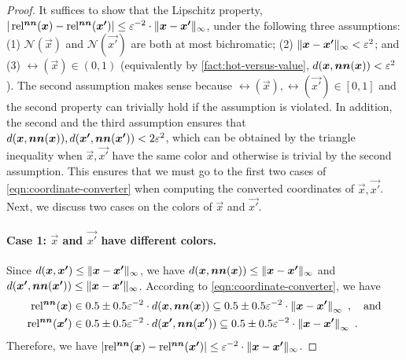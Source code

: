 \begin{proof}
    It suffices to show that the Lipschitz property, $|\operatorname*{rel^{\boldsymbol{nn}}}(\boldsymbol{x})-\operatorname*{rel^{\boldsymbol{nn}}}(\boldsymbol{x'})|\leq \varepsilon^{-2} \cdot \| {\boldsymbol{x}-\boldsymbol{x'}} \|_{\infty}$, under the following three assumptions: (1) $\mathcal{N}(\vec{x})$ and $\mathcal{N}(\vec{x'})$ are both at most bichromatic; (2) $\| {\boldsymbol{x}-\boldsymbol{x'}} \|_{\infty} < \varepsilon^2$; and (3) $\rel(\vec{x})\in (0,1)$ (equivalently by \cref{fact:hot-versus-value}, $d(\boldsymbol{x}, \operatorname*{\boldsymbol{nn}}(\boldsymbol{x}))<\varepsilon^2$). 
    The second assumption makes sense because $\rel(\vec{x}), \rel(\vec{x'})\in [0,1]$ and the second property can trivially hold if the assumption is violated.
    In addition, the second and the third assumption ensures that $d(\boldsymbol{x}, \operatorname*{\boldsymbol{nn}}(\boldsymbol{x})), d(\boldsymbol{x'}, \operatorname*{\boldsymbol{nn}}(\boldsymbol{x'})) < 2\varepsilon^2$, which
    can be obtained by the triangle inequality when $\vec{x}, \vec{x'}$ have the same color and otherwise is trivial by the second assumption.
    This ensures that we must go to the first two cases of \cref{eqn:coordinate-converter} when computing the converted coordinates of $\vec{x}, \vec{x'}$. 
    Next, we discuss two cases on the colors of $\vec{x}$ and $\vec{x'}$.

    \paragraph{Case 1: $\vec{x}$ and $\vec{x'}$ have different colors.}
    Since $d(\boldsymbol{x},\boldsymbol{x'})\leq \| {\boldsymbol{x}-\boldsymbol{x'}} \|_{\infty}$, we have 
    $d(\boldsymbol{x}, \boldsymbol{nn}(\boldsymbol{x}))\leq \| {\boldsymbol{x}-\boldsymbol{x'}} \|_{\infty}$ and $d(\boldsymbol{x'}, \boldsymbol{nn}(\boldsymbol{x'}))\leq \| {\boldsymbol{x}-\boldsymbol{x'}} \|_{\infty}$.
    According to \cref{eqn:coordinate-converter}, we have
    \begin{align*}
        \operatorname*{rel^{\boldsymbol{nn}}}(\boldsymbol{x}) &\in 0.5 \pm 0.5\varepsilon^{-2} \cdot d(\boldsymbol{x}, \boldsymbol{nn}(\boldsymbol{x})) \subseteq 0.5 \pm 0.5\varepsilon^{-2} \cdot \left \| {\boldsymbol{x}-\boldsymbol{x'}} \right\|_{\infty}~, \quad \text{and}\\
        \operatorname*{rel^{\boldsymbol{nn}}}(\boldsymbol{x'}) &\in 0.5 \pm 0.5\varepsilon^{-2} \cdot d(\boldsymbol{x'}, \boldsymbol{nn}(\boldsymbol{x'})) \subseteq 0.5 \pm 0.5\varepsilon^{-2} \cdot \left \| {\boldsymbol{x}-\boldsymbol{x'}} \right\|_{\infty}~.
    \end{align*}
    Therefore, we have $|{\operatorname*{rel^{\boldsymbol{nn}}}(\boldsymbol{x})-\operatorname*{rel^{\boldsymbol{nn}}}(\boldsymbol{x'})} |\leq \varepsilon^{-2} \cdot \| {\boldsymbol{x}-\boldsymbol{x'}} \|_{\infty}$.


\end{proof}
